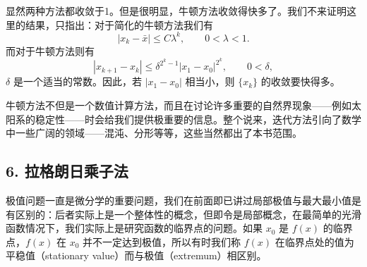 显然两种方法都收敛于1。但是很明显，牛顿方法收敛得快多了。我们不来证明这里的结果，只指出：对于简化的牛顿方法我们有
\[
 |x_k-\bar x|\le C\lambda^k,\qquad 0<\lambda<1.
\]
而对于牛顿方法则有
\[
 |x_{k+1}-x_k|
 \le \delta^{2^k-1}|x_1-x_0|^{2^k},
 \qquad 0<\delta,
\]
$\delta$ 是一个适当的常数。因此，若 $|x_1-x_0|$ 相当小，则 $\{x_k\}$ 的收敛要快得多。

牛顿方法不但是一个数值计算方法，而且在讨论许多重要的自然界现象——例如太阳系的稳定性——时会给我们提供极重要的信息。整个说来，迭代方法引向了数学中一些广阔的领域——混沌、分形等等，这些当然都出了本书范围。

\subsection*{6. 拉格朗日乘子法}

极值问题一直是微分学的重要问题，我们在前面即已讲过局部极值与最大最小值是有区别的：后者实际上是一个整体性的概念，但即令是局部概念，在最简单的光滑函数情况下，我们实际上是研究函数的临界点的问题。如果 $x_0$ 是 $f(x)$ 的临界点，$f(x)$ 在 $x_0$ 并不一定达到极值，所以有时我们称 $f(x)$ 在临界点处的值为平稳值（stationary value）而与极值（extremum）相区别。

